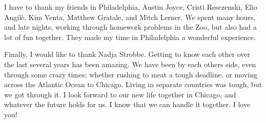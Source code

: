 I have to thank my friends in Philadelphia,
Austin Joyce,
Cristi Resczenski,
Elio Angil\`{e},
Kim Venta,
Matthew Gratale,
and Mitch Lerner.
We spent many hours, and late nights, working through homework problems in the
Zoo, but also had a lot of fun together.
They made my time in Philadelphia a wonderful experience.

Finally, I would like to thank Nadja Strobbe.
Getting to know each other over the last several years has been amazing.
We have been by each others side, even through some crazy times; whether
rushing to meat a tough deadline, or moving across the Atlantic Ocean to
Chicago.
Living in separate countries was tough, but we got through it.
I look forward to our new life together in Chicago, and whatever the future
holds for us.
I know that we can handle it together.
I love you!

